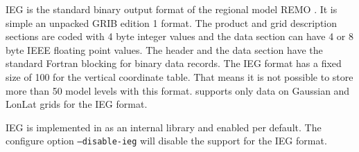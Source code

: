 IEG is the standard binary output format of the regional model REMO \cite{REMO}.
It is simple an unpacked GRIB edition 1 format. The product and grid
description sections are coded with 4 byte integer values and the
data section can have 4 or 8 byte IEEE floating point values.
The header and the data section have the standard Fortran blocking
for binary data records. The IEG format has a fixed size of 100 for the
vertical coordinate table. That means it is not possible to store more
than 50 model levels with this format.
{\CDI} supports only data on Gaussian and LonLat grids for the IEG format.

IEG is implemented in {\CDI} as an internal library and enabled per default.
The configure option \texttt{--disable-ieg} will disable the support for the IEG format.
